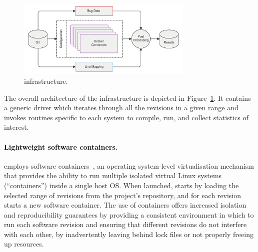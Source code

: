 \begin{figure}[t!]
\centering
\includegraphics[width=0.75\textwidth]{evolution/figures/pipeline}
\caption{\covrig infrastructure.}
\label{fig:arch}
\end{figure}

The overall architecture of the \covrig infrastructure is depicted
in Figure~\ref{fig:arch}.  It contains a generic driver which
iterates through all the revisions in a given range and invokes
routines specific to each system to compile, run, and collect
statistics of interest.



\paragraph{Lightweight software containers.} \covrig employs software
containers~\cite{containers:eurosys07}, an operating system-level
virtualisation mechanism that provides the ability to run multiple
isolated virtual Linux systems (``containers'') inside a single host
OS.  When launched, \covrig starts by loading the selected range of
revisions from the project's \git repository, and for each revision
starts a new software container.  The use of containers offers
increased isolation and reproducibility guarantees by providing a
consistent environment in which to run each software revision and
ensuring that different revisions do not interfere with each other,
\eg by inadvertently leaving behind lock files or not properly freeing
up resources.

